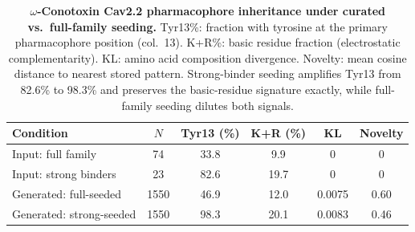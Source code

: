 \documentclass[journal=jcisd8,manuscript=article]{achemso}
\theoremstyle{definition}
\theoremstyle{remark}
\begin{document}
\begin{table}[p]
  \centering
  \caption{\textbf{$\omega$-Conotoxin Cav2.2 pharmacophore inheritance under curated vs.\
  full-family seeding.}
  Tyr13\%: fraction with tyrosine at the primary pharmacophore position (col.~13).
  K+R\%: basic residue fraction (electrostatic complementarity). KL: amino acid composition
  divergence. Novelty: mean cosine distance to nearest stored pattern. Strong-binder seeding
  amplifies Tyr13 from 82.6\% to 98.3\% and preserves the basic-residue signature exactly,
  while full-family seeding dilutes both signals.}
  \label{tab:conotoxin-pharmacophore}
  \small
  \begin{tabular}{lccccc}
    \toprule
    Condition & $N$ & Tyr13 (\%) & K+R (\%) & KL & Novelty \\
    \midrule
    Input: full family          &   74 & 33.8 &  9.9 & 0      & 0 \\
    Input: strong binders       &   23 & 82.6 & 19.7 & 0      & 0 \\
    Generated: full-seeded      & 1550 & 46.9 & 12.0 & 0.0075 & 0.60 \\
    Generated: strong-seeded    & 1550 & 98.3 & 20.1 & 0.0083 & 0.46 \\
    \bottomrule
  \end{tabular}
\end{table}
\end{document}
